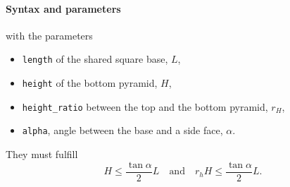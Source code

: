 \begin{figure}[h]
\hfill
{}
\hfill
{}
\hfill
{}
\hfill
\end{figure}

\FloatBarrier

\paragraph{Syntax and parameters}
\begin{quote}
\end{quote}
with the parameters
\begin{itemize}
\item \texttt{length} of the shared square base, $L$,
\item \texttt{height} of the bottom pyramid, $H$,
\item \texttt{height\_ratio} between the top and the bottom pyramid, $r_H$,
\item \texttt{alpha}, angle between the base and a side face, $\alpha$.
\end{itemize}
They must fulfill
\begin{displaymath}
  H \le \frac{\tan\alpha}{2} L
  \quad\text{and}\quad
  r_h H \le \frac{\tan\alpha}{2} L.
\end{displaymath}


